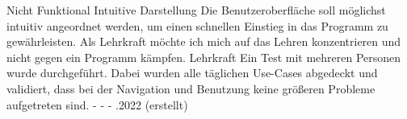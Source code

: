 \begin{myreq}
  \twoinline
    {}
    {\reqtype Nicht Funktional}
    {\reqevent Intuitive Darstellung}
  \reqdesc Die Benutzeroberfläche soll möglichst intuitiv angeordnet werden, um einen schnellen Einstieg in das Programm zu gewährleisten.
  \reqrat Als Lehrkraft möchte ich mich auf das Lehren konzentrieren und nicht gegen ein Programm kämpfen.
  \reqorig Lehrkraft
  \reqfit Ein Test mit mehreren Personen wurde durchgeführt. Dabei wurden alle täglichen Use-Cases abgedeckt und validiert, dass bei der Navigation und Benutzung keine größeren Probleme aufgetreten sind.
  \twoinline
    {}
    {}
  \twoinline
  {\reqdep -}
  {\reqconf -}
  \reqmater -
  .2022 (erstellt)
\end{myreq}

